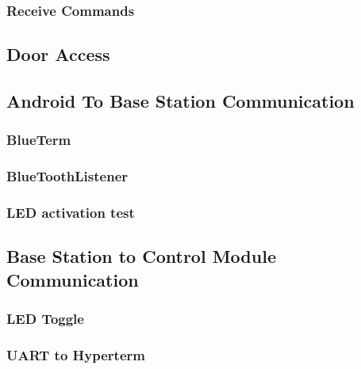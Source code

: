 \subsubsection{Receive Commands}

\subsection{Door Access}

\subsection{Android To Base Station Communication}

\subsubsection{BlueTerm}

\subsubsection{BlueToothListener}

\subsubsection{LED activation test}

\subsection{Base Station to Control Module Communication}

\subsubsection{LED Toggle}

\subsubsection{UART to Hyperterm}

